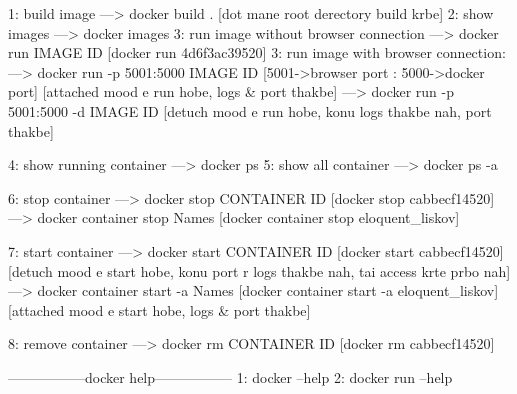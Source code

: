 1: build image ---> docker build . [dot mane root derectory build krbe]
2: show images ---> docker images
3: run image without browser connection ---> docker run IMAGE ID [docker run 4d6f3ac39520]
3: run image with browser connection:
---> docker run -p 5001:5000 IMAGE ID [5001->browser port : 5000->docker port] [attached mood e run hobe, logs & port thakbe]
---> docker run -p 5001:5000 -d IMAGE ID [detuch mood e run hobe, konu logs thakbe nah, port thakbe]

4: show running container ---> docker ps
5: show all container ---> docker ps -a

6: stop container 
---> docker stop CONTAINER ID [docker stop cabbecf14520]
---> docker container stop Names [docker container stop eloquent_liskov]

7: start container 
---> docker start CONTAINER ID [docker start cabbecf14520] [detuch mood e start hobe, konu port r logs thakbe nah, tai access krte prbo nah]
---> docker container start -a Names [docker container start -a eloquent_liskov] [attached mood e start hobe, logs & port thakbe]

8: remove container ---> docker rm CONTAINER ID [docker rm cabbecf14520]


-----------------docker help-----------------
1: docker --help
2: docker run --help
